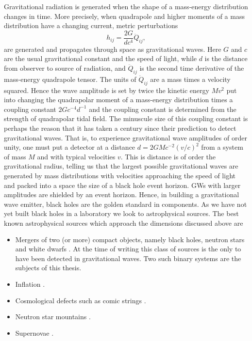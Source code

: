 Gravitational radiation is generated when the shape of a mass-energy distribution changes in time. More precisely, when quadrapole and higher moments of a mass distribution have a changing current, metric perturbations
\begin{equation}
h_{i j} = \frac{2G}{d c^4} \ddot{Q}_{ij},
\end{equation}
are generated and propagates through space as gravitational waves. Here $G$ and $c$ are the usual gravitational constant and the speed of light, while $d$ is the distance from observer to source of radiation, and $ \ddot{Q}_{ij}$ is the second time derivative of the mass-energy quadrapole tensor. The units of $\ddot{Q}_{ij}$ are a mass times a velocity squared. Hence the wave amplitude is set by twice the kinetic energy $M v^2$ put into changing the quadrapolar moment of a mass-energy distribution times a coupling constant $2 Gc^{-4}d^{-1}$ and the coupling constant is determined from the strength of quadrapolar tidal field. The minuscule size of this coupling constant is perhaps the reason that it has taken a century since their prediction to detect gravitational waves. That is, to experience gravitational wave amplitudes of order unity, one must put a detector at a distance $d= 2GMc^{-2} (v/c)^2$ from a system of mass $M$ and with typical velocities $v$. This is distance is of order the gravitational radius, telling us that the largest possible gravitational waves are generated by mass distributions with velocities approaching the speed of light and packed into a space the size of a black hole event horizon. GWs with larger amplitudes are shielded by an event horizon. Hence, in building a gravitational wave emitter, black holes are the golden standard in components. As we have not yet built black holes in a laboratory we look to astrophysical sources. The best known astrophysical sources which approach the dimensions discussed above are
\begin{itemize}
\item Mergers of two (or more) compact objects, namely black holes, neutron stars and white dwarfs \citep{}. At the time of writing this class of sources is the only to have been detected in gravitational waves\citep{GW091415}. Two such binary systems are the subjects of this thesis.
\item Inflation \citep[\textit{e.g.}][]{Guzzatti:2016}.
\item Cosmological defects such as comic strings  \citep[\textit{e.g.}][]{}.
\item Neutron star mountains  \citep[\textit{e.g.}][]{}.
\item Supernovae  \citep[\textit{e.g.}][]{}.
\end{itemize}


